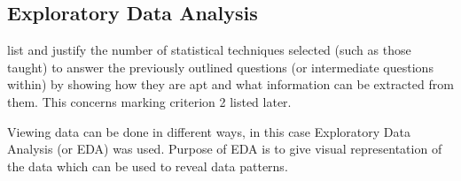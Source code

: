 \subsection{Exploratory Data Analysis}\label{subsection}
list and justify the number of statistical techniques selected (such as those taught) to answer the previously outlined questions (or intermediate questions within) by showing how they are apt and what information can be extracted from them. This concerns marking criterion 2 listed later. 

Viewing data can be done in different ways, in this case Exploratory Data Analysis (or EDA) was used. Purpose of EDA is to give visual representation of the data which can be used to reveal data patterns.


